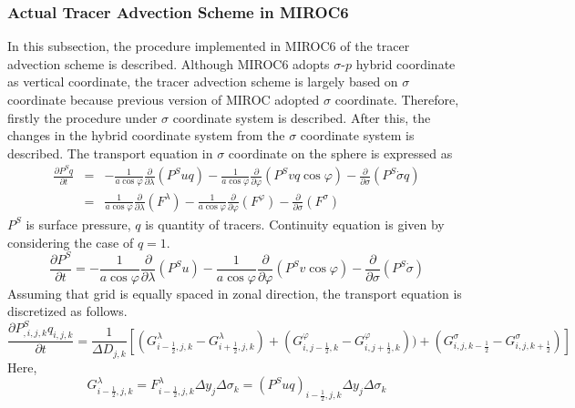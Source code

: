   \subsubsection{Actual Tracer Advection Scheme in MIROC6}
  In this subsection, the procedure implemented in MIROC6 of the tracer advection scheme is described.
  Although MIROC6 adopts $\sigma$-$p$ hybrid coordinate as vertical coordinate, the tracer advection scheme is largely based on $\sigma$ coordinate because previous version of MIROC adopted $\sigma$ coordinate.
  Therefore, firstly the procedure under $\sigma$ coordinate system is described.
  After this, the changes in the hybrid coordinate system from the $\sigma$ coordinate system is described.
The transport equation in $\sigma$ coordinate on the sphere is expressed as
\begin{eqnarray}
  \label{b1}
  \frac{\partial P^{S} q}{\partial t} &=& - \frac{1}{a \cos \varphi} \frac{\partial}{\partial \lambda}(P^{S} uq)- \frac{1}{a \cos \varphi} \frac{\partial}{\partial \varphi}(P^{S} vq \cos \varphi)- \frac{\partial}{\partial \sigma} (P^{S} \dot{\sigma} q)\\
  &=& \frac{1}{a \cos \varphi} \frac{\partial}{\partial \lambda}(F^{\lambda})- \frac{1}{a \cos \varphi} \frac{\partial}{\partial \varphi}(F^{\varphi})- \frac{\partial}{\partial \sigma} (F^{\sigma})
\end{eqnarray}
$P^{S}$ is surface pressure, $q$ is quantity of tracers.
Continuity equation is given by considering the case of $q=1$.
\begin{equation}
  \frac{\partial P^{S}}{\partial t} = - \frac{1}{a \cos \varphi} \frac{\partial}{\partial \lambda}(P^{S}u)- \frac{1}{a \cos \varphi} \frac{\partial}{\partial \varphi}(P^{S}v \cos \varphi)- \frac{\partial}{\partial \sigma} (P^{S} \dot{\sigma})
\end{equation}
Assuming that grid is equally spaced in zonal direction, the transport equation is discretized as follows.
\begin{equation}
\label{a1}
  \frac{\partial P^{S}_{,i,j,k} q_{i,j,k}}{\partial t}=\frac{1}{\Delta D_{j,k}}[(G^{\lambda}_{i-\frac{1}{2},j,k}-G^{\lambda}_{i+\frac{1}{2},j,k})+(G^{\varphi}_{i,j-\frac{1}{2},k}-G^{\varphi}_{i,j+\frac{1}{2},k}))+(G^{\sigma}_{i,j,k-\frac{1}{2}}-G^{\sigma}_{i,j,k+\frac{1}{2}})]
\end{equation}
Here,
\begin{equation}
  G^{\lambda}_{i-\frac{1}{2},j,k}=F^{\lambda}_{i-\frac{1}{2},j,k} \Delta y_{j} \Delta \sigma_{k}=(P^{S}uq)_{i-\frac{1}{2},j,k} \Delta y_{j} \Delta \sigma_{k}
\end{equation}

